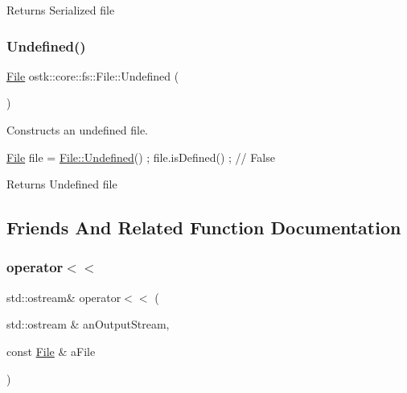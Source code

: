 \begin{DoxyReturn}{Returns}
Serialized file 
\end{DoxyReturn}
\mbox{\label{classostk_1_1core_1_1fs_1_1_file_a0df3ba12f33cbbd8f24b9d35cd4afaee}} 
\subsubsection{\texorpdfstring{Undefined()}{Undefined()}}
{\footnotesize\ttfamily \hyperlink{classostk_1_1core_1_1fs_1_1_file}{File} ostk\+::core\+::fs\+::\+File\+::\+Undefined (\begin{DoxyParamCaption}{ }\end{DoxyParamCaption})\hspace{0.3cm}{\ttfamily [static]}}



Constructs an undefined file. 


\begin{DoxyCode}
\hyperlink{classostk_1_1core_1_1fs_1_1_file_ad1695224996950be9962b8457da369b3}{File} file = \hyperlink{classostk_1_1core_1_1fs_1_1_file_a0df3ba12f33cbbd8f24b9d35cd4afaee}{File::Undefined}() ;
file.isDefined() ; \textcolor{comment}{// False}
\end{DoxyCode}


\begin{DoxyReturn}{Returns}
Undefined file 
\end{DoxyReturn}


\subsection{Friends And Related Function Documentation}
\mbox{\label{classostk_1_1core_1_1fs_1_1_file_a82ce9f27653427d53ecb90de978f4f68}} 
\subsubsection{\texorpdfstring{operator$<$$<$}{operator<<}}
{\footnotesize\ttfamily std\+::ostream\& operator$<$$<$ (\begin{DoxyParamCaption}\item[{std\+::ostream \&}]{an\+Output\+Stream,  }\item[{const \hyperlink{classostk_1_1core_1_1fs_1_1_file}{File} \&}]{a\+File }\end{DoxyParamCaption})\hspace{0.3cm}{\ttfamily [friend]}}



